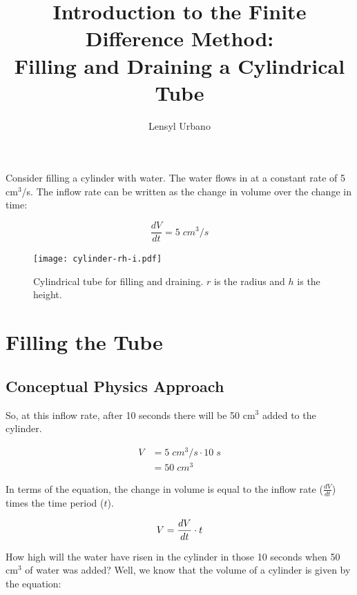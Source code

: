 \documentclass[11pt,fleqn]{article}
\title{Introduction to the Finite Difference Method: \\ Filling and Draining a Cylindrical Tube}
\author{Lensyl Urbano}
\begin{document}
         
 
\maketitle



Consider filling a cylinder with water. The water flows in at a constant rate of 5 cm$^3$/s. The inflow rate can be written as the change in volume over the change in time:

\begin{equation}
	\frac{dV}{dt} = 5 \; cm^3/s
\end{equation}

\begin{figure}
	\begin{center}
		
		\texttt{[image: cylinder-rh-i.pdf]}
		\caption{Cylindrical tube for filling and draining. $r$ is the radius and $h$ is the height.}
		
	\end{center}
\end{figure}

\section{Filling the Tube}

\subsection{Conceptual Physics Approach}

	      
So, at this inflow rate, after 10 seconds there will be 50 cm$^3$ added to the cylinder.

	\begin{align*}
		 V &= 5 \; cm^3/s \cdot 10 \; s \\
				&= 50 \; cm^3
	\end{align*}

In terms of the equation, the change in volume is equal to the inflow rate ($\frac{dV}{dt}$) times the time period ($ t$).

  \begin{equation}
  	\label{Vrate}
  	 V = \frac{dV}{d t} \cdot t \\
  \end{equation}

How high will the water have risen in the cylinder in those 10 seconds when 50 cm$^3$ of water was added? Well, we know that the volume of a cylinder is given by the equation:
\end{document}
